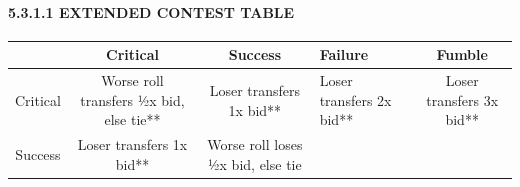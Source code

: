 \documentclass[
]{article}
\begin{document}
\hypertarget{extended-contest-table}{%
\paragraph{5.3.1.1 EXTENDED CONTEST
TABLE}\label{extended-contest-table}}

\begin{longtable}[]{@{}ccclc@{}}
\toprule
\begin{minipage}[b]{0.18\columnwidth}\centering
\strut
\end{minipage} & \begin{minipage}[b]{0.17\columnwidth}\centering
Critical\strut
\end{minipage} & \begin{minipage}[b]{0.18\columnwidth}\centering
Success\strut
\end{minipage} & \begin{minipage}[b]{0.17\columnwidth}\raggedright
Failure\strut
\end{minipage} & \begin{minipage}[b]{0.18\columnwidth}\centering
Fumble\strut
\end{minipage}\tabularnewline
\midrule
\endhead
\begin{minipage}[t]{0.18\columnwidth}\centering
Critical\strut
\end{minipage} & \begin{minipage}[t]{0.17\columnwidth}\centering
Worse roll transfers ½x bid, else tie**\strut
\end{minipage} & \begin{minipage}[t]{0.18\columnwidth}\centering
Loser transfers 1x bid**\strut
\end{minipage} & \begin{minipage}[t]{0.17\columnwidth}\raggedright
Loser transfers 2x bid**\strut
\end{minipage} & \begin{minipage}[t]{0.18\columnwidth}\centering
Loser transfers 3x bid**\strut
\end{minipage}\tabularnewline
\begin{minipage}[t]{0.18\columnwidth}\centering
Success\strut
\end{minipage} & \begin{minipage}[t]{0.17\columnwidth}\centering
Loser transfers 1x bid**\strut
\end{minipage} & \begin{minipage}[t]{0.18\columnwidth}\centering
Worse roll loses ½x bid, else tie\strut
\end{minipage} & \begin{minipage}[t]{0.17\columnwidth}\raggedright

\end{minipage}
\end{longtable}
\end{document}
